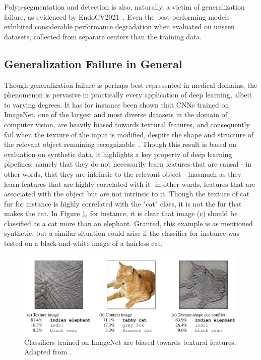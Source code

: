 	Polyp-segmentation and detection is also, naturally, a victim of generalization failure, as evidenced by EndoCV2021~\cite{endocv2021}. Even the best-performing models exhibited considerable performance degradation when evaluated on unseen datasets, collected from separate centers than the training data. 
	 
	\subsection{Generalization Failure in General}
	Though generalization failure is perhaps best represented in medical domains, the phenomenon is pervasive in practically every application of deep learning, albeit to varying degrees. It has for instance been shown that CNNs trained on ImageNet, one of the largest and most diverse datasets in the domain of computer vision, are heavily biased towards textural features, and consequently fail when the texture of the input is modified, despite the shape and structure of the relevant object remaining recognizable~\cite{texturebias}. Though this result is based on evaluation on synthetic data, it highlights a key property of deep learning pipelines: namely that they do not necessarily learn features that are causal - in other words, that they are intrinsic to the relevant object - inasmuch as they learn features that are highly correlated with it- in other words, features that are associated with the object but are not intrinsic to it. Though the texture of cat fur for instance is highly correlated with the "cat" class, it is not the fur that makes the cat. In Figure \ref{cat_elephant}, for instance, it is clear that image (c) should be classified as a cat more than an elephant. Granted, this example is as mentioned synthetic, but a similar situation could arise if the classifier for instance was tested on a black-and-white image of a hairless cat. 
	\begin{figure}[htb]
		\includegraphics[width=\linewidth]{illustrations/cat_elephant.png}
		\caption{Classifiers trained on ImageNet are biased towards textural features. Adapted from \cite{texturebias}.}
		\label{cat_elephant}
	\end{figure}
	
